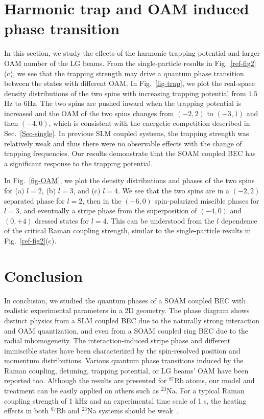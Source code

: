 \documentclass[twocolumn,pra,unsortedaddress,showpacs,floatfix,citeautoscript,nofootinbib]{revtex4-1}
\begin{document}
\vspace{-0.3cm}
\section{Harmonic trap and OAM induced phase transition}
\label{Sec-trap} \vspace{-0.3cm}

In this section, we study the effects of the harmonic trapping
potential and larger OAM number of the LG beams. From the
single-particle results in Fig.~\ref{ref-fig2}(c), we see that the
trapping strength may drive a quantum phase transition between the
states with different OAM. In Fig.~\ref{fig-trap}, we plot the
real-space density distributions of the two spins with increasing
trapping potential from $1.5$Hz to $6$Hz. The two spins are pushed
inward when the trapping potential is increased and the OAM of the
two spins changes from $(-2,2)$ to $(-3,1)$ and then $(-4,0)$,
which is consistent with the energetic competition described in
Sec.~\ref{Sec-single}. In previous SLM coupled systems, the
trapping strength was relatively weak and thus there were no
observable effects with the change of trapping frequencies. Our
results demonstrate that the SOAM coupled BEC has a significant
response to the trapping potential.

In Fig.~\ref{fig-OAM}, we plot the density distributions and
phases of the two spins for (a) $l=2$, (b) $l=3$, and (c) $l=4$.
We see that the two spins are in a $(-2, 2)$ separated phase for
$l=2$, then in the $(-6, 0)$ spin-polarized miscible phases for
$l=3$, and eventually a stripe phase from the superposition of
$(-4, 0)$ and $(0, +4)$ dressed states for $l=4$. This can be
understood from the $l$ dependence of the critical Raman coupling
strength, similar to the single-particle results in
Fig.~\ref{ref-fig2}(c).

\vspace{-0.3cm}
\section{Conclusion}
\label{Sec-diss} \vspace{-0.3cm}

In conclusion, we studied the quantum phases of a SOAM coupled BEC
with realistic experimental parameters in a 2D geometry. The phase
diagram shows distinct physics from a SLM coupled BEC due to the
naturally strong interaction and OAM quantization, and even from a
SOAM coupled ring BEC due to the radial inhomogeneity. The
interaction-induced stripe phase and different immiscible states
have been characterized by the spin-resolved position and momentum
distributions. Various quantum phase transitions induced by the
Raman coupling, detuning, trapping potential, or LG beams' OAM
have been reported too. Although the results are presented for
$^{87}$Rb atoms, our model and treatment can be easily applied on
others such as $^{23}$Na. For a typical Raman coupling strength of
1 kHz and an experimental time scale of 1 s, the heating effects
in both $^{87}$Rb and $^{23}$Na systems should be
weak~\cite{Wei2013,Sun2014}.
\end{document}

